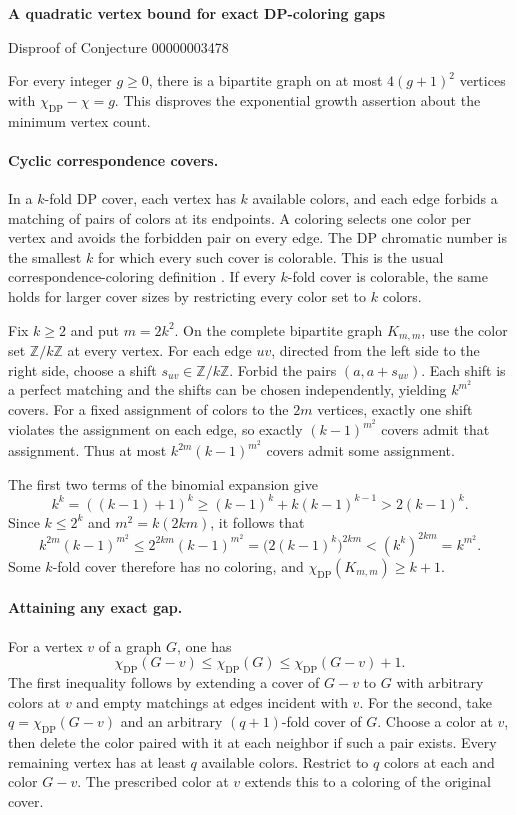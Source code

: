 \documentclass[10pt]{article}
\begin{document}
\begin{center}
  {\Large\bfseries A quadratic vertex bound for exact DP-coloring gaps\par}
  \smallskip
  Disproof of Conjecture 00000003478
\end{center}

For every integer \(g\ge 0\), there is a bipartite graph on at most
\(4(g+1)^2\) vertices with \(\chi_{\mathrm{DP}}-\chi=g\). This disproves
the exponential growth assertion about the minimum vertex count.

\paragraph{Cyclic correspondence covers.}
In a \(k\)-fold DP cover, each vertex has \(k\) available colors, and each
edge forbids a matching of pairs of colors at its endpoints. A coloring
selects one color per vertex and avoids the forbidden pair on every edge.
The DP chromatic number is the smallest \(k\) for which every such cover
is colorable. This is the usual correspondence-coloring definition
\cite{bernshteyn}. If every \(k\)-fold cover is colorable, the same holds
for larger cover sizes by restricting every color set to \(k\) colors.

Fix \(k\ge2\) and put \(m=2k^2\). On the complete bipartite graph
\(K_{m,m}\), use the color set \(\mathbb Z/k\mathbb Z\) at every vertex.
For each edge \(uv\), directed from the left side to the right side,
choose a shift \(s_{uv}\in\mathbb Z/k\mathbb Z\). Forbid the pairs
\((a,a+s_{uv})\). Each shift is a perfect matching and the shifts can
be chosen independently, yielding \(k^{m^2}\) covers. For a fixed
assignment of colors to the \(2m\) vertices, exactly one shift violates
the assignment on each edge, so exactly \((k-1)^{m^2}\) covers admit that
assignment. Thus at most \(k^{2m}(k-1)^{m^2}\) covers admit some assignment.

The first two terms of the binomial expansion give
\[
 k^k=((k-1)+1)^k\ge (k-1)^k+k(k-1)^{k-1}>2(k-1)^k.
\]
Since \(k\le 2^k\) and \(m^2=k(2km)\), it follows that
\[
 k^{2m}(k-1)^{m^2}
 \le 2^{2km}(k-1)^{m^2}
 =\bigl(2(k-1)^k\bigr)^{2km}
 <(k^k)^{2km}=k^{m^2}.
\]
Some \(k\)-fold cover therefore has no coloring, and
\(\chi_{\mathrm{DP}}(K_{m,m})\ge k+1\).

\paragraph{Attaining any exact gap.}
For a vertex \(v\) of a graph \(G\), one has
\[
 \chi_{\mathrm{DP}}(G-v)\le \chi_{\mathrm{DP}}(G)
 \le \chi_{\mathrm{DP}}(G-v)+1.
\]
The first inequality follows by extending a cover of \(G-v\) to \(G\)
with arbitrary colors at \(v\) and empty matchings at edges incident
with \(v\). For the second, take \(q=\chi_{\mathrm{DP}}(G-v)\) and an
arbitrary \((q+1)\)-fold cover of \(G\). Choose a color at \(v\), then
delete the color paired with it at each neighbor if such a pair exists.
Every remaining vertex has at least \(q\) available colors. Restrict to
\(q\) colors at each and color \(G-v\). The prescribed color at \(v\)
extends this to a coloring of the original cover.
\end{document}
